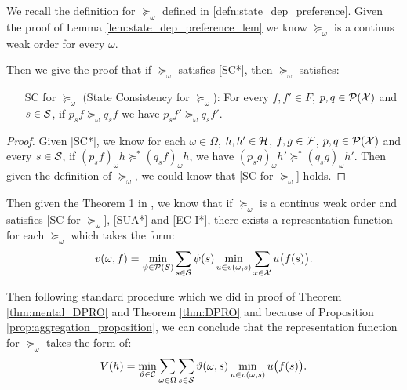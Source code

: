 \documentclass[11pt,oneside]{article}
\theoremstyle{plain}
\theoremstyle{plain}
\theoremstyle{plain}
\theoremstyle{plain}
\theoremstyle{plain}
\theoremstyle{definition}
\theoremstyle{definition}
\theoremstyle{remark}
\theoremstyle{plain}
\newcommand{\F}{{\cal F}}
\newcommand{\pfo}{\pf_\omega}
\newcommand{\calps}{{\cal P}({\cal S})}
\newcommand{\calpx}{{\cal P}({\cal X})}
\newcommand{\mcs}{{\cal S}}
\newcommand{\mcx}{{\cal X}}
\newcommand{\pf}{\succeq}
\newcommand{\pfs}{\succeq^*}
\newcommand{\smix}[2]{#1_s #2 }
\newcommand{\omix}[2]{#1_\omega #2 }
\begin{document}
We recall the definition for $\pfo$ defined in \ref{defn:state_dep_preference}. Given the proof of Lemma \ref{lem:state_dep_preference_lem} we know 
$\pfo$ is a continus weak order for every $\omega$.

Then we give the proof that if $\pfo$ satisfies [SC*], then $\pfo$ satisfies:
%
\begin{itemize}
    \item [SC for $\pfo$] (State Consistency for $\pfo$): For every $f,f' \in F$, $p,q \in \calpx$ and $s\in \mcs$, if $\smix{p}{f} \pfo \smix{q}{f}$  we have
    $\smix{p}{f'} \pfo \smix{q}{f'}$.
\end{itemize}
%
\begin{proof}
    Given [SC*], we know for each $\omega \in \Omega$, $h,h'\in {\cal H}$, $f,g \in \F$, $p,q \in \calpx$ and every $s\in \mcs$, if $\omix{(p_s f)}{h} \pfs \omix{(q_s f)}{h}$, we have
    $\omix{(p_s g)}{h'} \pfs \omix{(q_s g)}{h'}$. Then given the definition of $\pfo$, we could know that [SC for $\pfo$] holds.
\end{proof}

Then given the Theorem 1 in \cite{hill2019non}, we know that if $\pfo$ is a continus weak order and satisfies [SC for $\pfo$], [SUA*] and [EC-I*], there exists a representation function 
for each $\pfo$ which takes the form:
\[
v(\omega,f) = \min_{\psi \in \calps} \sum_{s\in \mcs} \psi(s) \min_{u \in v(\omega,s)} \sum_{x\in \mcx} u\big(f(s)\big).
\]

Then following standard procedure which we did in proof of Theorem \ref{thm:mental_DPRO} and Theorem \ref{thm:DPRO} and because of Proposition \ref{prop:aggregation_proposition}, we can conclude that the representation function for
$\pfo$ takes the form of:
\[
V(h) = \min_{\vartheta \in \mathcal{C}} \sum_{\omega \in \Omega}  \sum_{s\in \mcs} \vartheta(\omega,s) \min_{u \in v(\omega,s)} u\big(f(s)\big).
\]
\end{document}
